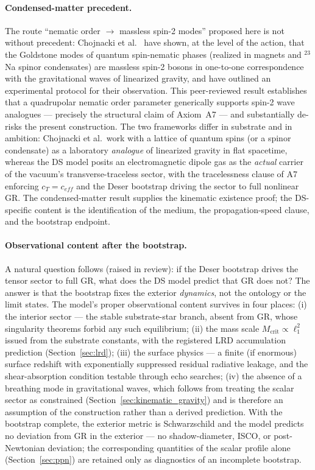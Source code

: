 \documentclass[11pt,a4paper]{article}
\theoremstyle{plain}
\theoremstyle{remark}
\begin{document}
\paragraph{Condensed-matter precedent.} The route ``nematic order $\to$ massless spin-2 modes'' proposed here is not without precedent: Chojnacki et al.\ \cite{chojnacki2024} have shown, at the level of the action, that the Goldstone modes of quantum spin-nematic phases (realized in magnets and $^{23}$Na spinor condensates) are massless spin-2 bosons in one-to-one correspondence with the gravitational waves of linearized gravity, and have outlined an experimental protocol for their observation. This peer-reviewed result establishes that a quadrupolar nematic order parameter generically supports spin-2 wave analogues --- precisely the structural claim of Axiom~A7 --- and substantially de-risks the present construction. The two frameworks differ in substrate and in ambition: Chojnacki et al.\ work with a lattice of quantum spins (or a spinor condensate) as a laboratory \emph{analogue} of linearized gravity in flat spacetime, whereas the DS model posits an electromagnetic dipole gas as the \emph{actual} carrier of the vacuum's transverse-traceless sector, with the tracelessness clause of A7 enforcing $c_T = c_{eff}$ and the Deser bootstrap driving the sector to full nonlinear GR. The condensed-matter result supplies the kinematic existence proof; the DS-specific content is the identification of the medium, the propagation-speed clause, and the bootstrap endpoint.

\paragraph{Observational content after the bootstrap.} A natural question follows (raised in review): if the Deser bootstrap drives the tensor sector to full GR, what does the DS model predict that GR does not? The answer is that the bootstrap fixes the exterior \emph{dynamics}, not the ontology or the limit states. The model's proper observational content survives in four places: (i) the interior sector --- the stable substrate-star branch, absent from GR, whose singularity theorems forbid any such equilibrium; (ii) the mass scale $M_{\text{crit}} \propto \ell_1^2$ issued from the substrate constants, with the registered LRD accumulation prediction (Section~\ref{sec:lrd}); (iii) the surface physics --- a finite (if enormous) surface redshift with exponentially suppressed residual radiative leakage, and the shear-absorption condition testable through echo searches; (iv) the absence of a breathing mode in gravitational waves, which follows from treating the scalar sector as constrained (Section~\ref{sec:kinematic_gravity}) and is therefore an assumption of the construction rather than a derived prediction. With the bootstrap complete, the exterior metric is Schwarzschild and the model predicts no deviation from GR in the exterior --- no shadow-diameter, ISCO, or post-Newtonian deviation; the corresponding quantities of the scalar profile alone (Section~\ref{sec:ppn}) are retained only as diagnostics of an incomplete bootstrap.
\end{document}
